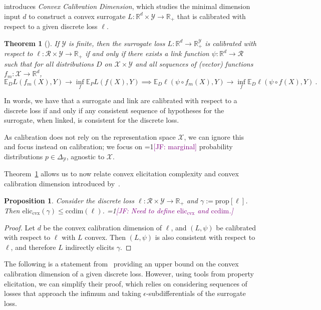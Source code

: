 \documentclass{article}
\newcommand{\Comments}{1}
\newcommand{\mynote}[2]{\ifnum\Comments=1\textcolor{#1}{#2}\fi}
\newcommand{\jessie}[1]{\mynote{purple}{[JF: #1]}}
\newcommand{\reals}{\mathbb{R}}
\newcommand{\simplex}{\Delta_\Y}
\newcommand{\prop}[1]{\mathrm{prop}[#1]}
\newcommand{\eliccvx}{\mathrm{elic}_\mathrm{cvx}}
\newcommand{\ccdim}{\mathrm{ccdim}}
\newcommand{\E}{\mathbb{E}}
\newcommand{\R}{\mathcal{R}}
\newcommand{\X}{\mathcal{X}}
\newcommand{\Y}{\mathcal{Y}}
\newtheorem{theorem}{Theorem}
\newtheorem{proposition}{Proposition}
\begin{document}
\cite{ramaswamy2016convex} introduces \emph{Convex Calibration Dimension}, which studies the minimal dimension input $d$ to construct a convex surrogate $L : \reals^d \times \Y \to \reals_+$ that is calibrated with respect to a given discrete loss $\ell$.

\begin{theorem}[\cite{ramaswamy2016convex}]\label{thm:calib-iff-consistent}
	If $\Y$ is finite, then the surrogate loss $L:\reals^d \to \reals^\Y_+$ is calibrated with respect to $\ell: \R \times \Y \to \reals_+$ if and only if there exists a link function $\psi : \reals^d \to \R$ such that for all distributions $D$ on $\X \times\Y$ and all sequences of (vector) functions $f_m : \X \to \reals^d$,
	\begin{equation*}
	\E_D L(f_m(X), Y) \to \inf_f \E_P L(f(X), Y) \implies \E_D \ell(\psi  \circ f_m(X), Y) \to \inf_f \E_D \ell(\psi \circ f(X), Y)~.~
	\end{equation*}
\end{theorem}
In words, we have that a surrogate and link are calibrated with respect to a discrete loss if and only if any consistent sequence of hypotheses for the surrogate, when linked, is consistent for the discrete loss.

As calibration does not rely on the representation space $\X$, we can ignore this and focus instead on calibration; we focus on \jessie{marginal} probability distributions $p \in \simplex$, agnostic to $\X$.

Theorem~\ref{thm:calib-iff-consistent} allows us to now relate convex elicitation complexity and convex calibration dimension introduced by~\cite[Definition 10]{ramaswamy2016convex}.
\begin{proposition}
	Consider the discrete loss $\ell : \R \times \Y \to \reals_+$ and $\gamma:= \prop{\ell}$.
	Then $\eliccvx(\gamma) \leq \ccdim(\ell)$.
	\jessie{Need to define $\eliccvx$ and $\ccdim$.}
\end{proposition}
\begin{proof}
	Let $d$ be the convex calibration dimension of $\ell$, and $(L, \psi)$ be calibrated with respect to $\ell$ with $L$ convex.
	Then $(L, \psi)$ is also consistent with respect to $\ell$, and therefore $L$ indirectly elicits $\gamma$.
\end{proof}


The following is a statement from~\cite{ramaswamy2016convex} providing an upper bound on the convex calibration dimension of a given discrete loss.
However, using tools from property elicitation, we can simplify their proof, which relies on considering sequences of losses that approach the infimum and taking $\epsilon$-subdifferentials of the surrogate loss.
\end{document}
